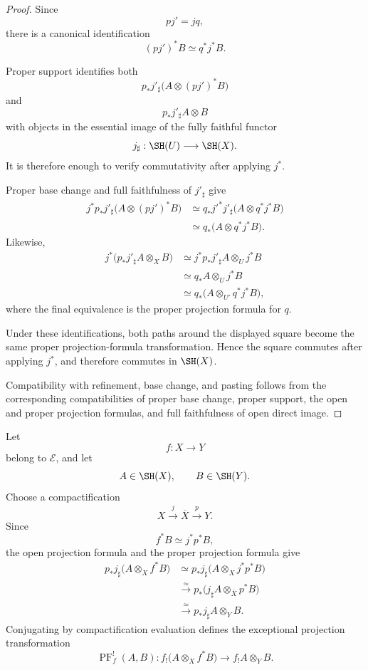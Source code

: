 \begin{proof}
Since
\[
    pj'=jq,
\]
there is a canonical identification
\[
    (pj')^*B
    \simeq
    q^*j^*B.
\]

Proper support identifies both
\[
    p_*j'_\sharp
    \bigl(
      A\otimes(pj')^*B
    \bigr)
\]
and
\[
    p_*j'_\sharp A\otimes B
\]
with objects in the essential image of the fully faithful functor
\[
    j_\sharp:\SH(U)\longrightarrow\SH(X).
\]
It is therefore enough to verify commutativity after applying \(j^*\).

Proper base change and full faithfulness of \(j'_\sharp\) give
\[
\begin{aligned}
    j^*p_*j'_\sharp
    \bigl(
      A\otimes(pj')^*B
    \bigr)
    &\simeq
    q_*j'^*j'_\sharp
    \bigl(
      A\otimes q^*j^*B
    \bigr) \\
    &\simeq
    q_*
    \bigl(
      A\otimes q^*j^*B
    \bigr).
\end{aligned}
\]
Likewise,
\[
\begin{aligned}
    j^*
    \bigl(
      p_*j'_\sharp A\otimes_XB
    \bigr)
    &\simeq
    j^*p_*j'_\sharp A\otimes_Uj^*B \\
    &\simeq
    q_*A\otimes_Uj^*B \\
    &\simeq
    q_*
    \bigl(
      A\otimes_{U'}q^*j^*B
    \bigr),
\end{aligned}
\]
where the final equivalence is the proper projection formula for \(q\).

Under these identifications, both paths around the displayed square become
the same proper projection-formula transformation.  Hence the square
commutes after applying \(j^*\), and therefore commutes in \(\SH(X)\).

Compatibility with refinement, base change, and pasting follows from the
corresponding compatibilities of proper base change, proper support, the
open and proper projection formulas, and full faithfulness of open direct
image.
\end{proof}

\begin{construction}
\label{constr:exceptional-projection}
Let
\[
    f:X\longrightarrow Y
\]
belong to \(\mathcal E\), and let
\[
    A\in\SH(X),
    \qquad
    B\in\SH(Y).
\]
Choose a compactification
\[
    X\xrightarrow{j}\overline X\xrightarrow{p}Y.
\]
Since
\[
    f^*B\simeq j^*p^*B,
\]
the open projection formula and the proper projection formula give
\[
\begin{aligned}
    p_*j_\sharp
    \bigl(
      A\otimes_Xf^*B
    \bigr)
    &\simeq
    p_*j_\sharp
    \bigl(
      A\otimes_Xj^*p^*B
    \bigr) \\
    &\xrightarrow{\simeq}
    p_*
    \bigl(
      j_\sharp A\otimes_{\overline X}p^*B
    \bigr) \\
    &\xrightarrow{\simeq}
    p_*j_\sharp A\otimes_YB.
\end{aligned}
\]
Conjugating by compactification evaluation defines the exceptional
projection transformation
\[
    \operatorname{PF}^!_f(A,B):
    f_!
    \bigl(
      A\otimes_Xf^*B
    \bigr)
    \longrightarrow
    f_!A\otimes_YB.
\]
\end{construction}

